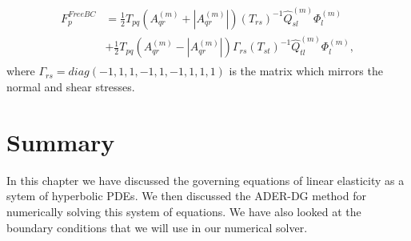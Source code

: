 \begin{align}
    \begin{split}
    F_{p}^{FreeBC} &= \frac{1}{2}T_{pq}\left(A_{qr}^{\left(m\right)} + \left|A_{qr}^{\left(m\right)}\right|\right) \left(T_{rs}\right)^{-1} \hat{Q}_{sl}^{\left(m\right)} \Phi_l^{\left(m\right)}
    \\ &+ \frac{1}{2} T_{pq} \left(A_{qr}^{\left(m\right)} - \left|A_{qr}^{\left(m\right)}\right|\right) \Gamma_{rs} \left(T_{st}\right)^{-1} \hat{Q}_{tl}^{\left(m\right)} \Phi_l^{\left(m\right)} ,
    \end{split}
\end{align}
where $\Gamma_{rs} = diag\left(-1,1,1,-1,1,-1,1,1,1\right)$ is the matrix which mirrors the normal and shear stresses.

\section{Summary}
In this chapter we have discussed the governing equations of linear elasticity as a sytem of hyperbolic \ac{PDE}s. We then discussed the 
\ac{ADER}-\ac{DG} method for numerically solving this system of equations. We have also looked at the boundary conditions that we will use in our numerical solver.
